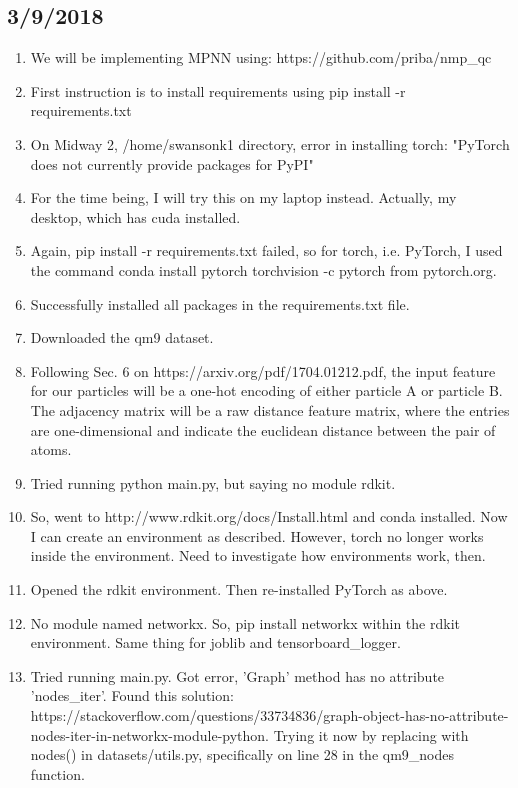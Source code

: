 \documentclass[12pt,reqno]{amsart}
\numberwithin{equation}{section}
\begin{document}
\subsection{3/9/2018}
\begin{enumerate}
\item We will be implementing MPNN using: https://github.com/priba/nmp\_qc
\item First instruction is to install requirements using pip install -r requirements.txt
\item On Midway 2, /home/swansonk1 directory, error in installing torch: "PyTorch does not currently provide packages for PyPI"
\item For the time being, I will try this on my laptop instead.  Actually, my desktop, which has cuda installed.   
\item Again, pip install -r requirements.txt failed, so for torch, i.e. PyTorch, I used the command conda install pytorch torchvision -c pytorch from pytorch.org. 
\item Successfully installed all packages in the requirements.txt file.  
\item Downloaded the qm9 dataset.  
\item Following Sec. 6 on https://arxiv.org/pdf/1704.01212.pdf, the input feature for our particles will be a one-hot encoding of either particle A or particle B.  The adjacency matrix will be a raw distance feature matrix, where the entries are one-dimensional and indicate the euclidean distance between the pair of atoms.  
\item Tried running python main.py, but saying no module rdkit.
\item So, went to http://www.rdkit.org/docs/Install.html and conda installed.  Now I can create an environment as described.  However, torch no longer works inside the environment.  Need to investigate how environments work, then.  
\item Opened the rdkit environment.  Then re-installed PyTorch as above.
\item No module named networkx.  So, pip install networkx within the rdkit environment.  Same thing for joblib and tensorboard\_logger. 
\item Tried running main.py.  Got error, 'Graph' method has no attribute 'nodes\_iter'.  Found this solution: https://stackoverflow.com/questions/33734836/graph-object-has-no-attribute-nodes-iter-in-networkx-module-python.  Trying it now by replacing with nodes() in datasets/utils.py, specifically on line 28 in the qm9\_nodes function.        

\end{enumerate}
\end{document}
